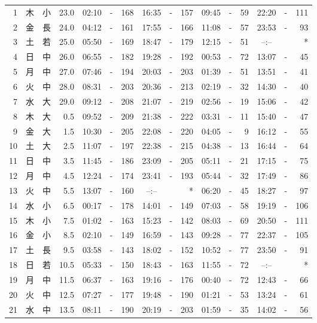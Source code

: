 \documentclass[12pt.a4j]{jsarticle}
\begin{document}
\begin{center}
\begin{table}[ht]
\begin{tabular}{|rc|cr|ccrccr|ccrccr|}
\hline
 1 & 木 & 小 & 23.0 & 02:10 &-& 168 & 16:35 &-& 157 & 09:45 &-&  59 & 22:20 &-& 111 \\
 2 & 金 & 長 & 24.0 & 04:12 &-& 161 & 17:55 &-& 166 & 11:08 &-&  57 & 23:53 &-&  93 \\
 3 & 土 & 若 & 25.0 & 05:50 &-& 169 & 18:47 &-& 179 & 12:15 &-&  51 & --:-- & &  *  \\
 4 & 日 & 中 & 26.0 & 06:55 &-& 182 & 19:28 &-& 192 & 00:53 &-&  72 & 13:07 &-&  45 \\
 5 & 月 & 中 & 27.0 & 07:46 &-& 194 & 20:03 &-& 203 & 01:39 &-&  51 & 13:51 &-&  41 \\
 6 & 火 & 中 & 28.0 & 08:31 &-& 203 & 20:36 &-& 213 & 02:19 &-&  32 & 14:30 &-&  40 \\
 7 & 水 & 大 & 29.0 & 09:12 &-& 208 & 21:07 &-& 219 & 02:56 &-&  19 & 15:06 &-&  42 \\
 8 & 木 & 大 &  0.5 & 09:52 &-& 209 & 21:38 &-& 222 & 03:31 &-&  11 & 15:40 &-&  47 \\
 9 & 金 & 大 &  1.5 & 10:30 &-& 205 & 22:08 &-& 220 & 04:05 &-&   9 & 16:12 &-&  55 \\
10 & 土 & 大 &  2.5 & 11:07 &-& 197 & 22:38 &-& 215 & 04:38 &-&  13 & 16:44 &-&  64 \\
11 & 日 & 中 &  3.5 & 11:45 &-& 186 & 23:09 &-& 205 & 05:11 &-&  21 & 17:15 &-&  75 \\
12 & 月 & 中 &  4.5 & 12:24 &-& 174 & 23:41 &-& 193 & 05:44 &-&  32 & 17:49 &-&  86 \\
13 & 火 & 中 &  5.5 & 13:07 &-& 160 & --:-- & &  *  & 06:20 &-&  45 & 18:27 &-&  97 \\
14 & 水 & 小 &  6.5 & 00:17 &-& 178 & 14:01 &-& 149 & 07:03 &-&  58 & 19:19 &-& 106 \\
15 & 木 & 小 &  7.5 & 01:02 &-& 163 & 15:23 &-& 142 & 08:03 &-&  69 & 20:50 &-& 111 \\
16 & 金 & 小 &  8.5 & 02:10 &-& 149 & 16:59 &-& 143 & 09:28 &-&  77 & 22:37 &-& 105 \\
17 & 土 & 長 &  9.5 & 03:58 &-& 143 & 18:02 &-& 152 & 10:52 &-&  77 & 23:50 &-&  91 \\
18 & 日 & 若 & 10.5 & 05:33 &-& 150 & 18:43 &-& 163 & 11:55 &-&  72 & --:-- & &  *  \\
19 & 月 & 中 & 11.5 & 06:37 &-& 163 & 19:16 &-& 176 & 00:40 &-&  72 & 12:43 &-&  66 \\
20 & 火 & 中 & 12.5 & 07:27 &-& 177 & 19:48 &-& 190 & 01:21 &-&  53 & 13:24 &-&  61 \\
21 & 水 & 中 & 13.5 & 08:11 &-& 190 & 20:19 &-& 203 & 01:59 &-&  35 & 14:02 &-&  56 \\

\end{tabular}
\end{table}
\end{center}
\end{document}
